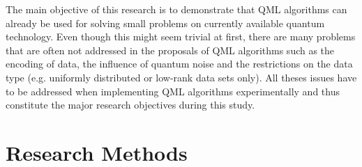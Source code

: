\documentclass[a4paper]{article}
\newcommand*{\0}{$\ket{0}$}
\newcommand*{\1}{$\ket{1}$}
\begin{document}
The main objective of this research is to demonstrate that QML algorithms can already be used for solving small problems on currently available quantum technology. Even though this might seem trivial at first, there are many problems that are often not addressed in the proposals of QML algorithms such as the encoding of data, the influence of quantum noise and the restrictions on the data type (e.g. uniformly distributed or low-rank data sets only). All theses issues have to be addressed when implementing QML algorithms experimentally and thus constitute the major research objectives during this study. 




\newpage
		
\section{Research Methods}
\label{sec:researchmethods}
\end{document}
